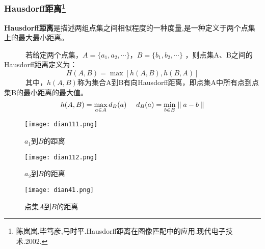 \documentclass[notheorems,mathserif,table,compress]{beamer}  %
\begin{document}
\begin{frame}
\frametitle{Hausdorff距离\footnote{陈岚岚,毕笃彦,马时平.Hausdorff距离在图像匹配中的应用.现代电子技术.2002.}}
   {\color{blue}\textbf{Hausdorff距离}}是描述两组点集之间相似程度的一种度量,是一种定义于两个点集上的最大最小距离。

~~~~~~若给定两个点集，$A=\{a_{1},a_{2},\cdots\}$，$B=\{b_{1},b_{2},\cdots\}$ ，则点集A、B之间的Hausdorff距离定义为：
\begin{displaymath}
H(A,B)=\max[h(A,B),h(B,A)]
\end{displaymath}
~~~~~~其中，$h(A,B)$称为集合A到B有向Hausdorff距离，即点集A中所有点到点集B的最小距离的最大值。
\begin{displaymath}
h(A,B)=\max_{\begin{subarray}{l}
              a\in A
               \end{subarray}}
       d_{B}(a)
~~~~
d_{B}(a)=\min_{\begin{subarray}{l}
              b\in B
               \end{subarray}}
        \parallel a-b \parallel
\end{displaymath}
\end{frame}



\begin{frame}

   \begin{figure}[!ht]
    \begin{minipage}{0.4\textwidth}
    \centering
    \texttt{[image: dian111.png]}
    \caption{$a_{1}$到$B$的距离}
    \end{minipage}
    \begin{minipage}{0.4\textwidth}
    \centering
    \texttt{[image: dian112.png]}
    \caption{$a_{2}$到$B$的距离}
    \end{minipage}
   \end{figure}
\end{frame}

\begin{frame}
   \begin{figure}[!ht]
    \centering
    \texttt{[image: dian41.png]}
    \caption{点集$A$到$B$的距离}
   \end{figure}
\end{frame}
\end{document}
